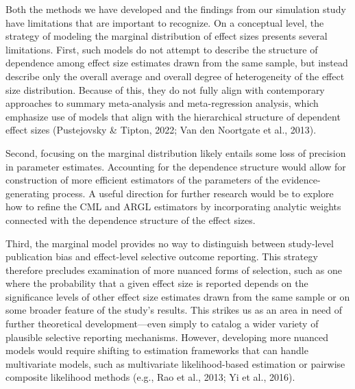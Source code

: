 \documentclass[
  man, donotrepeattitle,floatsintext]{apa7}
\begin{document}
Both the methods we have developed and the findings from our simulation study have limitations that are important to recognize.
On a conceptual level, the strategy of modeling the marginal distribution of effect sizes presents several limitations.
First, such models do not attempt to describe the structure of dependence among effect size estimates drawn from the same sample, but instead describe only the overall average and overall degree of heterogeneity of the effect size distribution.
Because of this, they do not fully align with contemporary approaches to summary meta-analysis and meta-regression analysis, which emphasize use of models that align with the hierarchical structure of dependent effect sizes (Pustejovsky \& Tipton, 2022; Van den Noortgate et al., 2013).

Second, focusing on the marginal distribution likely entails some loss of precision in parameter estimates.
Accounting for the dependence structure would allow for construction of more efficient estimators of the parameters of the evidence-generating process.
A useful direction for further research would be to explore how to refine the CML and ARGL estimators by incorporating analytic weights connected with the dependence structure of the effect sizes.

Third, the marginal model provides no way to distinguish between study-level publication bias and effect-level selective outcome reporting.
This strategy therefore precludes examination of more nuanced forms of selection, such as one where the probability that a given effect size is reported depends on the significance levels of other effect size estimates drawn from the same sample or on some broader feature of the study's results.
This strikes us as an area in need of further theoretical development---even simply to catalog a wider variety of plausible selective reporting mechanisms.
However, developing more nuanced models would require shifting to estimation frameworks that can handle multivariate models, such as multivariate likelihood-based estimation or pairwise composite likelihood methods (e.g., Rao et al., 2013; Yi et al., 2016).
\end{document}
